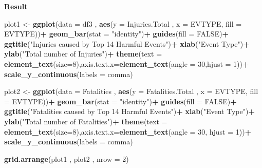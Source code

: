 \documentclass[
]{article}
\newenvironment{Shaded}{\begin{snugshade}}{\end{snugshade}}
\newcommand{\DataTypeTok}[1]{\textcolor[rgb]{0.13,0.29,0.53}{#1}}
\newcommand{\DecValTok}[1]{\textcolor[rgb]{0.00,0.00,0.81}{#1}}
\newcommand{\KeywordTok}[1]{\textcolor[rgb]{0.13,0.29,0.53}{\textbf{#1}}}
\newcommand{\NormalTok}[1]{#1}
\newcommand{\OperatorTok}[1]{\textcolor[rgb]{0.81,0.36,0.00}{\textbf{#1}}}
\newcommand{\OtherTok}[1]{\textcolor[rgb]{0.56,0.35,0.01}{#1}}
\newcommand{\StringTok}[1]{\textcolor[rgb]{0.31,0.60,0.02}{#1}}
\begin{document}
\textbf{Result}

\begin{Shaded}
\begin{Highlighting}[]
\NormalTok{plot1 <-}\StringTok{ }\KeywordTok{ggplot}\NormalTok{(}\DataTypeTok{data =}\NormalTok{ df3 , }\KeywordTok{aes}\NormalTok{(}\DataTypeTok{y =}\NormalTok{ Injuries.Total , }\DataTypeTok{x =}\NormalTok{ EVTYPE, }\DataTypeTok{fill =}\NormalTok{ EVTYPE))}\OperatorTok{+}
\StringTok{    }\KeywordTok{geom_bar}\NormalTok{(}\DataTypeTok{stat =} \StringTok{"identity"}\NormalTok{)}\OperatorTok{+}
\StringTok{    }\KeywordTok{guides}\NormalTok{(}\DataTypeTok{fill =} \OtherTok{FALSE}\NormalTok{)}\OperatorTok{+}
\StringTok{    }\KeywordTok{ggtitle}\NormalTok{(}\StringTok{"Injuries caused by Top 14 Harmful Events"}\NormalTok{)}\OperatorTok{+}
\StringTok{    }\KeywordTok{xlab}\NormalTok{(}\StringTok{"Event Type"}\NormalTok{)}\OperatorTok{+}
\StringTok{    }\KeywordTok{ylab}\NormalTok{(}\StringTok{"Total number of Injuries"}\NormalTok{)}\OperatorTok{+}
\StringTok{    }\KeywordTok{theme}\NormalTok{(}\DataTypeTok{text =} \KeywordTok{element_text}\NormalTok{(}\DataTypeTok{size=}\DecValTok{8}\NormalTok{),}\DataTypeTok{axis.text.x=}\KeywordTok{element_text}\NormalTok{(}\DataTypeTok{angle =} \DecValTok{30}\NormalTok{,}\DataTypeTok{hjust =} \DecValTok{1}\NormalTok{))}\OperatorTok{+}
\StringTok{    }\KeywordTok{scale_y_continuous}\NormalTok{(}\DataTypeTok{labels =}\NormalTok{ comma)}

\NormalTok{plot2 <-}\StringTok{ }\KeywordTok{ggplot}\NormalTok{(}\DataTypeTok{data =}\NormalTok{ Fatalities , }\KeywordTok{aes}\NormalTok{(}\DataTypeTok{y =}\NormalTok{ Fatalities.Total , }\DataTypeTok{x =}\NormalTok{ EVTYPE, }\DataTypeTok{fill =}\NormalTok{ EVTYPE))}\OperatorTok{+}
\StringTok{    }\KeywordTok{geom_bar}\NormalTok{(}\DataTypeTok{stat =} \StringTok{"identity"}\NormalTok{)}\OperatorTok{+}
\StringTok{    }\KeywordTok{guides}\NormalTok{(}\DataTypeTok{fill =} \OtherTok{FALSE}\NormalTok{)}\OperatorTok{+}
\StringTok{    }\KeywordTok{ggtitle}\NormalTok{(}\StringTok{"Fatalities caused by Top 14 Harmful Events"}\NormalTok{)}\OperatorTok{+}
\StringTok{    }\KeywordTok{xlab}\NormalTok{(}\StringTok{"Event Type"}\NormalTok{)}\OperatorTok{+}
\StringTok{    }\KeywordTok{ylab}\NormalTok{(}\StringTok{"Total number of Fatalities"}\NormalTok{)}\OperatorTok{+}
\StringTok{    }\KeywordTok{theme}\NormalTok{(}\DataTypeTok{text =} \KeywordTok{element_text}\NormalTok{(}\DataTypeTok{size=}\DecValTok{8}\NormalTok{),}\DataTypeTok{axis.text.x=}\KeywordTok{element_text}\NormalTok{(}\DataTypeTok{angle =} \DecValTok{30}\NormalTok{, }\DataTypeTok{hjust =} \DecValTok{1}\NormalTok{))}\OperatorTok{+}
\StringTok{    }\KeywordTok{scale_y_continuous}\NormalTok{(}\DataTypeTok{labels =}\NormalTok{ comma)}

\KeywordTok{grid.arrange}\NormalTok{(plot1 , plot2 , }\DataTypeTok{nrow =} \DecValTok{2}\NormalTok{)}
\end{Highlighting}
\end{Shaded}
\end{document}
